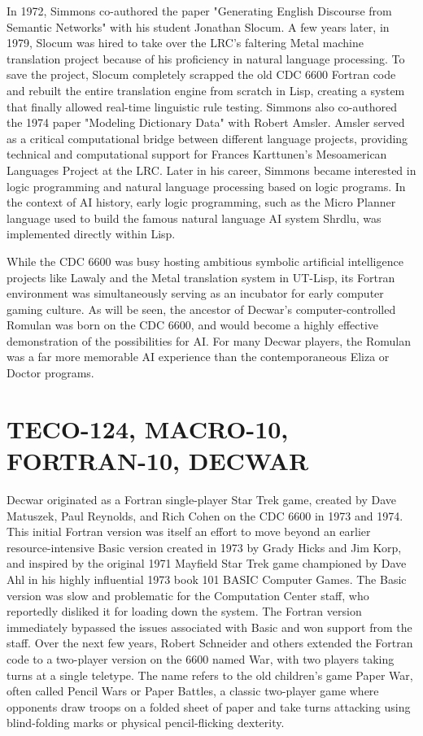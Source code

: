 In 1972, Simmons co-authored the paper "Generating English Discourse from Semantic Networks" with his student Jonathan Slocum. A few years later, in 1979, Slocum was hired to take over the LRC's faltering Metal machine translation project because of his proficiency in natural language processing. To save the project, Slocum completely scrapped the old CDC 6600 Fortran code and rebuilt the entire translation engine from scratch in Lisp, creating a system that finally allowed real-time linguistic rule testing. Simmons also co-authored the 1974 paper "Modeling Dictionary Data" with Robert Amsler. Amsler served as a critical computational bridge between different language projects, providing technical and computational support for Frances Karttunen's Mesoamerican Languages Project at the LRC. Later in his career, Simmons became interested in logic programming and natural language processing based on logic programs. In the context of AI history, early logic programming, such as the Micro Planner language used to build the famous natural language AI system Shrdlu, was implemented directly within Lisp.

While the CDC 6600 was busy hosting ambitious symbolic artificial intelligence projects like Lawaly and the Metal translation system in UT-Lisp, its Fortran environment was simultaneously serving as an incubator for early computer gaming culture. As will be seen, the ancestor of Decwar’s computer-controlled Romulan was born on the CDC 6600, and would become a highly effective demonstration of the possibilities for AI. For many Decwar players, the Romulan was a far more memorable AI experience than the contemporaneous Eliza or Doctor programs.

\section{TECO-124, MACRO-10, FORTRAN-10, DECWAR}

Decwar originated as a Fortran single-player Star Trek game, created by Dave Matuszek, Paul Reynolds, and Rich Cohen on the CDC 6600 in 1973 and 1974. This initial Fortran version was itself an effort to move beyond an earlier resource-intensive Basic version created in 1973 by Grady Hicks and Jim Korp, and inspired by the original 1971 Mayfield Star Trek game championed by Dave Ahl in his highly influential 1973 book 101 BASIC Computer Games. The Basic version was slow and problematic for the Computation Center staff, who reportedly disliked it for loading down the system. The Fortran version immediately bypassed the issues associated with Basic and won support from the staff. Over the next few years, Robert Schneider and others extended the Fortran code to a two-player version on the 6600 named War, with two players taking turns at a single teletype. The name refers to the old children's game Paper War, often called Pencil Wars or Paper Battles, a classic two-player game where opponents draw troops on a folded sheet of paper and take turns attacking using blind-folding marks or physical pencil-flicking dexterity. 

